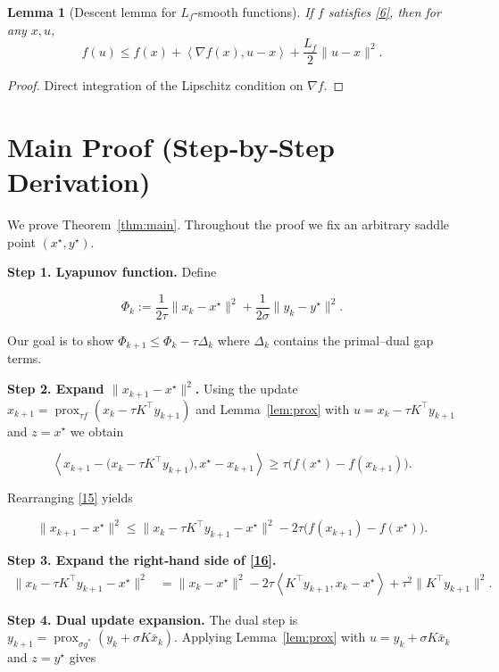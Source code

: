 \documentclass{article}
\newtheorem{lemma}{Lemma}
\newcommand{\inner}[2]{\left\langle #1,#2\right\rangle}
\begin{document}
\begin{lemma}[Descent lemma for $L_{f}$‑smooth functions]\label{lem:descent}
If $f$ satisfies \eqref{6}, then for any $x,u$,
\[
f(u)\le f(x)+\inner{\nabla f(x)}{u-x}
+\frac{L_{f}}{2}\|u-x\|^{2}.
\tag{13}
\]
\end{lemma}
\begin{proof}
Direct integration of the Lipschitz condition on $\nabla f$.
\end{proof}

\section*{Main Proof (Step‑by‑Step Derivation)}
We prove Theorem~\ref{thm:main}.  Throughout the proof we fix an arbitrary
saddle point $(x^{\star},y^{\star})$.

\noindent\textbf{Step 1.  Lyapunov function.}  
Define  

\[
\Phi_{k}:=
\frac{1}{2\tau}\|x_{k}-x^{\star}\|^{2}
+\frac{1}{2\sigma}\|y_{k}-y^{\star}\|^{2}.
\tag{14}
\]

Our goal is to show $\Phi_{k+1}\le \Phi_{k}-\tau\Delta_{k}$ where
$\Delta_{k}$ contains the primal–dual gap terms.

\noindent\textbf{Step 2.  Expand $\|x_{k+1}-x^{\star}\|^{2}$.}  
Using the update $x_{k+1}= \operatorname{prox}_{\tau f}(x_{k}-\tau K^{\!\top}y_{k+1})$ and
Lemma~\ref{lem:prox} with $u=x_{k}-\tau K^{\!\top}y_{k+1}$ and $z=x^{\star}$ we obtain  

\[
\inner{x_{k+1}-\bigl(x_{k}-\tau K^{\!\top}y_{k+1}\bigr)}{x^{\star}-x_{k+1}}
\ge \tau\bigl(f(x^{\star})-f(x_{k+1})\bigr).
\tag{15}
\]

Rearranging \eqref{15} yields  

\[
\|x_{k+1}-x^{\star}\|^{2}
\le\|x_{k}-\tau K^{\!\top}y_{k+1}-x^{\star}\|^{2}
-2\tau\bigl(f(x_{k+1})-f(x^{\star})\bigr).
\tag{16}
\]

\noindent\textbf{Step 3.  Expand the right‑hand side of \eqref{16}.}
\[
\begin{aligned}
\|x_{k}-\tau K^{\!\top}y_{k+1}-x^{\star}\|^{2}
&=\|x_{k}-x^{\star}\|^{2}
-2\tau\inner{K^{\!\top}y_{k+1}}{x_{k}-x^{\star}}
+\tau^{2}\|K^{\!\top}y_{k+1}\|^{2}.
\end{aligned}
\tag{17}
\]

\noindent\textbf{Step 4.  Dual update expansion.}  
The dual step is $y_{k+1}= \operatorname{prox}_{\sigma g^{*}}(y_{k}+\sigma K\bar x_{k})$.
Applying Lemma~\ref{lem:prox} with $u=y_{k}+\sigma K\bar x_{k}$ and $z=y^{\star}$ gives  
\end{document}
